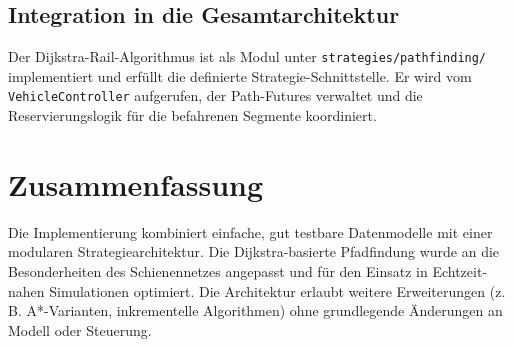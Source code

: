 \subsection*{Integration in die Gesamtarchitektur}
Der Dijkstra-Rail-Algorithmus ist als Modul unter \texttt{strategies/pathfinding/} implementiert und erfüllt die definierte Strategie-Schnittstelle. Er wird vom \texttt{VehicleController} aufgerufen, der Path-Futures verwaltet und die Reservierungslogik für die befahrenen Segmente koordiniert.

\section*{Zusammenfassung}
Die Implementierung kombiniert einfache, gut testbare Datenmodelle mit einer modularen Strategiearchitektur. Die Dijkstra-basierte Pfadfindung wurde an die Besonderheiten des Schienennetzes angepasst und für den Einsatz in Echtzeit-nahen Simulationen optimiert. Die Architektur erlaubt weitere Erweiterungen (z. B. A*-Varianten, inkrementelle Algorithmen) ohne grundlegende Änderungen an Modell oder Steuerung.

